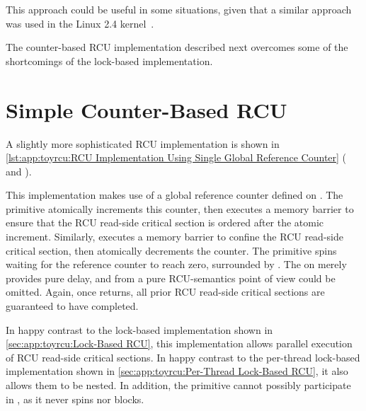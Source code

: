 This approach could be useful in some situations, given that a similar
approach was used in the
Linux 2.4 kernel~\cite{Molnar00a}.

The counter-based RCU implementation described next overcomes some of
the shortcomings of the lock-based implementation.

\section{Simple Counter-Based RCU}
\label{sec:app:toyrcu:Simple Counter-Based RCU}

A slightly more sophisticated RCU implementation is shown in
\cref{lst:app:toyrcu:RCU Implementation Using Single Global Reference Counter}
( and ).
\begin{fcvref}
This implementation makes use of a global reference counter
 defined on .
The  primitive atomically increments this
counter, then executes a memory barrier to ensure that the
RCU read-side critical section is ordered after the atomic
increment.
Similarly,  executes a memory barrier to
confine the RCU read-side critical section, then atomically
decrements the counter.
The  primitive spins waiting for the reference
counter to reach zero, surrounded by .
The  on  merely provides pure delay, and from
a pure RCU-semantics point of view could be omitted.
Again, once  returns, all prior
RCU read-side critical sections are guaranteed to have completed.
\end{fcvref}

\begin{listing}
\vspace*{-11pt}
\caption{RCU Implementation Using Single Global Reference Counter}
\label{lst:app:toyrcu:RCU Implementation Using Single Global Reference Counter}
\end{listing}

In happy contrast to the lock-based implementation shown in
\cref{sec:app:toyrcu:Lock-Based RCU}, this implementation
allows parallel execution of RCU read-side critical sections.
In happy contrast to the per-thread lock-based implementation shown in
\cref{sec:app:toyrcu:Per-Thread Lock-Based RCU},
it also allows them to be nested.
In addition, the  primitive cannot possibly
participate in , as it never spins nor blocks.

